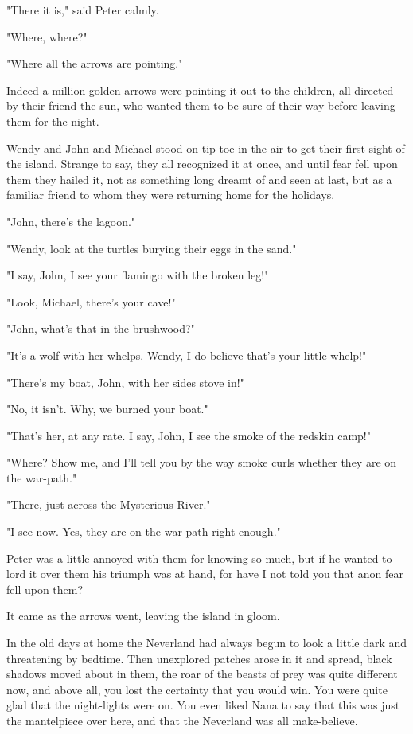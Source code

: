 "There it is," said Peter calmly.


"Where, where?"


"Where all the arrows are pointing."


Indeed a million golden arrows were pointing it out to the children, all
directed by their friend the sun, who wanted them to be sure of their way
before leaving them for the night.


Wendy and John and Michael stood on tip-toe in the air to get their first
sight of the island. Strange to say, they all recognized it at once, and
until fear fell upon them they hailed it, not as something long dreamt of
and seen at last, but as a familiar friend to whom they were returning
home for the holidays.


"John, there's the lagoon."


"Wendy, look at the turtles burying their eggs in the sand."


"I say, John, I see your flamingo with the broken leg!"


"Look, Michael, there's your cave!"


"John, what's that in the brushwood?"


"It's a wolf with her whelps. Wendy, I do believe that's your little
whelp!"


"There's my boat, John, with her sides stove in!"


"No, it isn't. Why, we burned your boat."


"That's her, at any rate. I say, John, I see the smoke of the redskin
camp!"


"Where? Show me, and I'll tell you by the way smoke curls whether they are
on the war-path."


"There, just across the Mysterious River."


"I see now. Yes, they are on the war-path right enough."


Peter was a little annoyed with them for knowing so much, but if he wanted
to lord it over them his triumph was at hand, for have I not told you that
anon fear fell upon them?


It came as the arrows went, leaving the island in gloom.


In the old days at home the Neverland had always begun to look a little
dark and threatening by bedtime. Then unexplored patches arose in it and
spread, black shadows moved about in them, the roar of the beasts of prey
was quite different now, and above all, you lost the certainty that you
would win. You were quite glad that the night-lights were on. You even
liked Nana to say that this was just the mantelpiece over here, and that
the Neverland was all make-believe.



